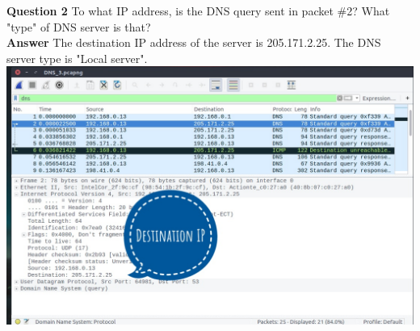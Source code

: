 \documentclass[14pt]{extarticle}
\begin{document}
    \noindent
    \textbf{\large Question 2}
    To what IP address, is the DNS query sent in packet \#2? What "type" of DNS server is that?\\[10pt]
    \textbf{\large Answer}
    The destination IP address of the server is 205.171.2.25. The DNS server type is "Local server".\\[10pt]
    \includegraphics[scale=0.45]{3_2}\\[10pt]
    \vspace{1cm}
\end{document}
